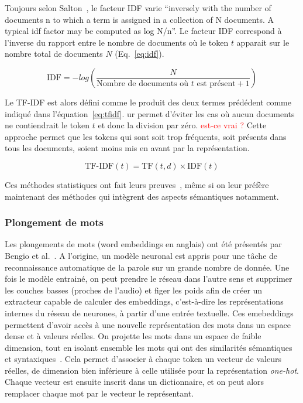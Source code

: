 Toujours selon Salton~\cite{salton_tf_idf}, le facteur IDF varie ``inversely with the number of documents n to which a term is assigned in a collection of N documents. A typical idf factor may be computed as log N/n''.
Le facteur IDF correspond à l'inverse du rapport entre le nombre de documents où le token $t$ apparait sur le nombre total de documents $N$ (Eq.~\ref{eq:idf}).

\begin{equation}
    \text{IDF} = - log\left(\dfrac{N}{\text{Nombre de documents où } t \text{ est présent} + 1} \right)
\label{eq:idf}
\end{equation}

Le TF-IDF est alors défini comme le produit des deux termes prédédent comme indiqué dans l'équation~\ref{eq:tfidf}.
ur permet d'éviter les cas où aucun documents ne contiendrait le token $t$ et donc la division par zéro.\textcolor{red}{ est-ce vrai ?}
Cette approche permet que les tokens qui sont soit trop fréquents, soit présents dans tous les documents, soient moins mis en avant par la représentation.

\begin{equation}
    \text{TF-IDF}(t) = \text{TF}(t,d) \times \text{IDF}(t)
\label{eq:tfidf}
\end{equation}

Ces méthodes statistiques ont fait leurs preuves~\cite{Martineau2009,Cambria2013,Pimpalkar2020}, même si on leur préfère maintenant des méthodes qui intègrent des aspects sémantiques notamment.

\subsubsection{Plongement de mots}


Les plongements de mots (word embeddings en anglais) ont été présentés par Bengio et al.~\cite{Bengio2003}.
A l'origine, un modèle neuronal est appris pour une tâche de reconnaissance automatique de la parole sur un grande nombre de donnée. Une fois le modèle entrainé, on peut prendre le réseau dans l'autre sens et supprimer les couches basses (proches de l'audio) et figer les poids afin de créer un extracteur capable de calculer des embeddings, c'est-à-dire les représentations internes du réseau de neurones, à partir d'une entrée textuelle. Ces emebeddings permettent d'avoir accès à une nouvelle représentation des mots dans un espace dense et à valeurs réelles.
On projette les mots dans un espace de faible dimension, tout en isolant ensemble les mots qui ont des similarités sémantiques et syntaxiques~\cite{Ghannay2017}. Cela permet d'associer à chaque token un vecteur de valeurs réelles, de dimension bien inférieure à celle utilisée pour la représentation \textit{one-hot}. Chaque vecteur est ensuite inscrit dans un dictionnaire, et on peut alors remplacer chaque mot par le vecteur le représentant.

